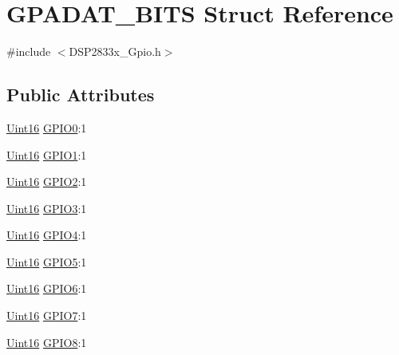 \hypertarget{struct_g_p_a_d_a_t___b_i_t_s}{}\section{G\+P\+A\+D\+A\+T\+\_\+\+B\+I\+T\+S Struct Reference}
\label{struct_g_p_a_d_a_t___b_i_t_s}


{\ttfamily \#include $<$D\+S\+P2833x\+\_\+\+Gpio.\+h$>$}

\subsection*{Public Attributes}
\begin{DoxyCompactItemize}
\item 
\hyperlink{_d_s_p2833x___device_8h_a59a9f6be4562c327cbfb4f7e8e18f08b}{Uint16} \hyperlink{struct_g_p_a_d_a_t___b_i_t_s_ac3f5536d7a957c9c0081e67abe9b41f6}{G\+P\+I\+O0}\+:1
\item 
\hyperlink{_d_s_p2833x___device_8h_a59a9f6be4562c327cbfb4f7e8e18f08b}{Uint16} \hyperlink{struct_g_p_a_d_a_t___b_i_t_s_af07cf5c7ee552b3d7294639cea9450bb}{G\+P\+I\+O1}\+:1
\item 
\hyperlink{_d_s_p2833x___device_8h_a59a9f6be4562c327cbfb4f7e8e18f08b}{Uint16} \hyperlink{struct_g_p_a_d_a_t___b_i_t_s_af8a7d31ee85edc78a56d89a74b90d64e}{G\+P\+I\+O2}\+:1
\item 
\hyperlink{_d_s_p2833x___device_8h_a59a9f6be4562c327cbfb4f7e8e18f08b}{Uint16} \hyperlink{struct_g_p_a_d_a_t___b_i_t_s_ae0cdbcd198c504b596d2d8dfde9cc13c}{G\+P\+I\+O3}\+:1
\item 
\hyperlink{_d_s_p2833x___device_8h_a59a9f6be4562c327cbfb4f7e8e18f08b}{Uint16} \hyperlink{struct_g_p_a_d_a_t___b_i_t_s_a60e900937c2d93c7f1a25d32ca8eefbc}{G\+P\+I\+O4}\+:1
\item 
\hyperlink{_d_s_p2833x___device_8h_a59a9f6be4562c327cbfb4f7e8e18f08b}{Uint16} \hyperlink{struct_g_p_a_d_a_t___b_i_t_s_a5ea180a156d9d32e889b3a4af4ecd7e8}{G\+P\+I\+O5}\+:1
\item 
\hyperlink{_d_s_p2833x___device_8h_a59a9f6be4562c327cbfb4f7e8e18f08b}{Uint16} \hyperlink{struct_g_p_a_d_a_t___b_i_t_s_a9542378c2ac1c876ef158e2329453dda}{G\+P\+I\+O6}\+:1
\item 
\hyperlink{_d_s_p2833x___device_8h_a59a9f6be4562c327cbfb4f7e8e18f08b}{Uint16} \hyperlink{struct_g_p_a_d_a_t___b_i_t_s_ad466d5fdc128e643c0a3208e7b053c16}{G\+P\+I\+O7}\+:1
\item 
\hyperlink{_d_s_p2833x___device_8h_a59a9f6be4562c327cbfb4f7e8e18f08b}{Uint16} \hyperlink{struct_g_p_a_d_a_t___b_i_t_s_add12038a6e1717beabf8569c959ef374}{G\+P\+I\+O8}\+:1

\end{DoxyCompactItemize}
